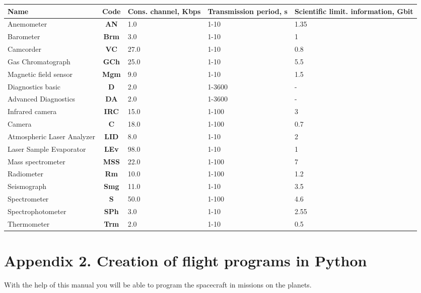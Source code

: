 \documentclass[12pt,a4paper]{article}
\begin{document}
\begin{center}
\begin{longtable}{ |p{4cm}|c|p{3cm}|p{3cm}|p{3cm}| }
  \hline
  \textbf{Name} & \textbf{Code} &
   \textbf{Cons. channel, Kbps} & \textbf{Transmission period, s} &
   \textbf{Scientific limit. information, Gbit}\\
   \hline
  \endhead
Anemometer & \textbf{AN} & 1.0 & 1-10 & 1.35 \\
\hline
Barometer & \textbf{Brm} & 3.0 & 1-10 & 1 \\
\hline
Camcorder & \textbf{VC} & 27.0 & 1-10 & 0.8 \\
\hline
Gas Chromatograph & \textbf{GCh} & 25.0 & 1-10 & 5.5 \\
\hline
Magnetic field sensor & \textbf{Mgm} & 9.0 & 1-10 & 1.5 \\
\hline
Diagnostics basic & \textbf{D} & 2.0 & 1-3600 & - \\
\hline
Advanced Diagnostics & \textbf{DA} & 2.0 & 1-3600 & - \\
\hline
Infrared camera & \textbf{IRC} & 15.0 & 1-100 & 3 \\
\hline
Camera & \textbf{C} & 18.0 & 1-100 & 0.7 \\
\hline
Atmospheric Laser Analyzer & \textbf{LID} & 8.0 & 1-10 & 2 \\
\hline
Laser Sample Evaporator & \textbf{LEv} & 98.0 & 1-10 & 1 \\
\hline
Mass spectrometer & \textbf{MSS} & 22.0 & 1-100 & 7 \\
\hline
Radiometer & \textbf{Rm} & 10.0 & 1-100 & 1.2 \\
\hline
Seismograph & \textbf{Smg} & 11.0 & 1-10 & 3.5 \\
\hline
Spectrometer & \textbf{S} & 50.0 & 1-100 & 4.6 \\
\hline
Spectrophotometer & \textbf{SPh} & 3.0 & 1-10 & 2.55 \\
\hline
Thermometer & \textbf{Trm} & 2.0 & 1-10 & 0.5 \\
\hline
\end{longtable}
\end{center}

\section*{Appendix 2. Creation of flight programs in Python}
\label{Sec:Python}

With the help of this manual you will be able to program the spacecraft in missions on the planets.
\end{document}
